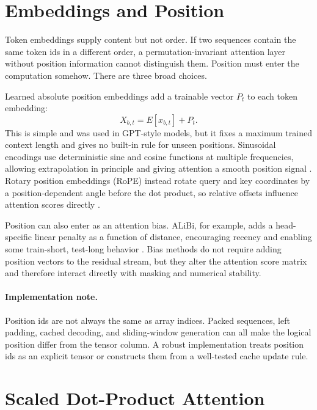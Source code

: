 \section{Embeddings and Position}
\label{sec:embeddings-position}

Token embeddings supply content but not order. If two sequences contain the same token ids in a different order, a permutation-invariant attention layer without position information cannot distinguish them. Position must enter the computation somehow. There are three broad choices.

Learned absolute position embeddings add a trainable vector $P_t$ to each token embedding:
\begin{equation}
  X_{b,t} = E[x_{b,t}] + P_t.
\end{equation}
This is simple and was used in GPT-style models, but it fixes a maximum trained context length and gives no built-in rule for unseen positions. Sinusoidal encodings use deterministic sine and cosine functions at multiple frequencies, allowing extrapolation in principle and giving attention a smooth position signal \cite{vaswani2017attention}. Rotary position embeddings (RoPE) instead rotate query and key coordinates by a position-dependent angle before the dot product, so relative offsets influence attention scores directly \cite{su2021roformer}.

Position can also enter as an attention bias. ALiBi, for example, adds a head-specific linear penalty as a function of distance, encouraging recency and enabling some train-short, test-long behavior \cite{press2021train}. Bias methods do not require adding position vectors to the residual stream, but they alter the attention score matrix and therefore interact directly with masking and numerical stability.

\paragraph{Implementation note.}
Position ids are not always the same as array indices. Packed sequences, left padding, cached decoding, and sliding-window generation can all make the logical position differ from the tensor column. A robust implementation treats position ids as an explicit tensor or constructs them from a well-tested cache update rule.

\section{Scaled Dot-Product Attention}
\label{sec:scaled-dot-product-attention}

